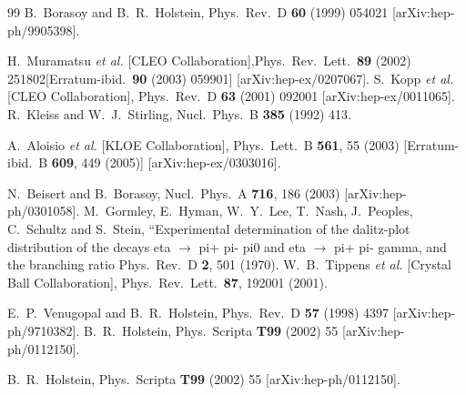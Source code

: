 \documentclass{article}
\begin{document}
\begin{thebibliography}{99}
B.~Borasoy and B.~R.~Holstein,
Phys.\ Rev.\  D {\bf 60} (1999) 054021 [arXiv:hep-ph/9905398].

 H.~Muramatsu {\it et al.}  [CLEO Collaboration],Phys.\ Rev.\ Lett.\  {\bf 89} (2002) 251802[Erratum-ibid.\  {\bf 90} (2003) 059901] [arXiv:hep-ex/0207067].
 S.~Kopp {\it et al.}  [CLEO Collaboration], Phys.\ Rev.\  D {\bf 63} (2001) 092001 [arXiv:hep-ex/0011065].
 R.~Kleiss and W.~J.~Stirling,
Nucl.\ Phys.\  B {\bf 385} (1992) 413.

  A.~Aloisio {\it et al.}  [KLOE Collaboration],
  Phys.\ Lett.\  B {\bf 561}, 55 (2003)
  [Erratum-ibid.\  B {\bf 609}, 449 (2005)]
  [arXiv:hep-ex/0303016].

  N.~Beisert and B.~Borasoy,
  Nucl.\ Phys.\  A {\bf 716}, 186 (2003)
  [arXiv:hep-ph/0301058].
  M.~Gormley, E.~Hyman, W.~Y.~Lee, T.~Nash, J.~Peoples, C.~Schultz and S.~Stein,
   ``Experimental determination of the dalitz-plot distribution of the decays
   eta $\to$ pi+ pi- pi0 and eta $\to$ pi+ pi- gamma, and the branching ratio
  Phys.\ Rev.\  D {\bf 2}, 501 (1970).
  W.~B.~Tippens {\it et al.}  [Crystal Ball Collaboration],
  Phys.\ Rev.\ Lett.\  {\bf 87}, 192001 (2001).

 E.~P.~Venugopal and B.~R.~Holstein,
Phys.\ Rev.\  D {\bf 57} (1998) 4397 [arXiv:hep-ph/9710382].
 B.~R.~Holstein,
 Phys.\ Scripta {\bf T99} (2002) 55 [arXiv:hep-ph/0112150].

 B.~R.~Holstein,
 Phys.\ Scripta {\bf T99} (2002) 55 [arXiv:hep-ph/0112150].


\end{thebibliography}
\end{document}
